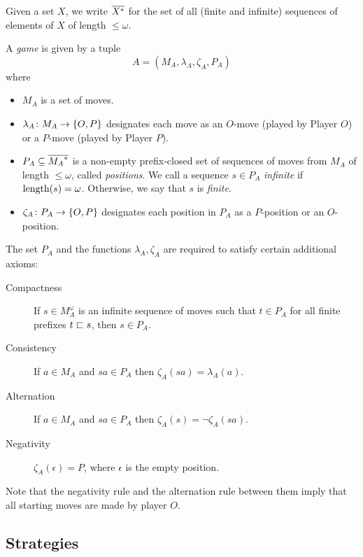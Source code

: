 \documentclass{article}
\begin{document}
\begin{definition}

  Given a set $X$, we write ${\overline{{X}^{*}}}$ for the set of all (finite and infinite) sequences of elements of $X$ of length $\le \omega$.  

  A \emph{game} is given by a tuple
  \[
    A = (M_A, \lambda_A, \zeta_A, P_A)
    \]
  where
  \begin{itemize}
    \item $M_A$ is a set of moves.
    \item $\lambda_A\colon M_A\to\{O,P\}$ designates each move as an $O$-move (played by Player $O$) or a $P$-move (played by Player $P$).  
    \item $P_A\subseteq {\overline{{M_A}^{*}}}$ is a non-empty prefix-closed set of sequences of moves from $M_A$ of length $\le\omega$, called \emph{positions}.  We call a sequence $s\in P_A$ \emph{infinite} if $\operatorname{length}(s)=\omega$.  Otherwise, we say that $s$ is \emph{finite}.
    \item $\zeta_A\colon P_A\to\{O,P\}$ designates each position in $P_A$ as a $P$-position or an $O$-position.
  \end{itemize}

  The set $P_A$ and the functions $\lambda_A,\zeta_A$ are required to satisfy certain additional axioms:
  \begin{description}
    \item[Compactness] If $s\in M_A^\omega$ is an infinite sequence of moves such that $t\in P_A$ for all finite prefixes $t\sqsubset s$, then $s\in P_A$.
    \item[Consistency] If $a\in M_A$ and $sa\in P_A$ then $\zeta_A(sa)=\lambda_A(a)$.
    \item[Alternation] If $a\in M_A$ and $sa\in P_A$ then $\zeta_A(s) = \neg \zeta_A(sa)$.
    \item[Negativity] $\zeta_A(\epsilon)=P$, where $\epsilon$ is the empty position.
  \end{description}

  Note that the negativity rule and the alternation rule between them imply that all starting moves are made by player $O$.  
\end{definition}

\subsection{Strategies}
\end{document}
